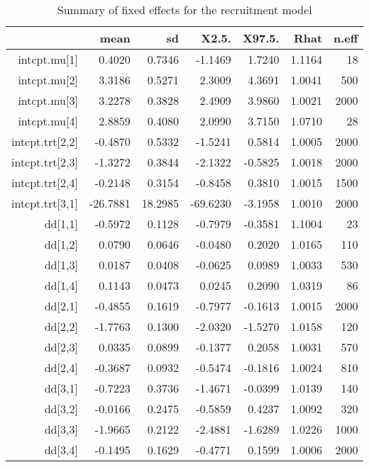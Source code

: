 \documentclass[11pt]{article}
\begin{document}
\begin{table}[ht]
\centering
\caption{Summary of fixed effects for the recruitment model} 
\label{table:recruitment}
\begin{tabular}{rrrrrrr}
  \hline
 & mean & sd & X2.5. & X97.5. & Rhat & n.eff \\ 
  \hline
intcpt.mu[1] & 0.4020 & 0.7346 & -1.1469 & 1.7240 & 1.1164 &    18 \\ 
  intcpt.mu[2] & 3.3186 & 0.5271 & 2.3009 & 4.3691 & 1.0041 &   500 \\ 
  intcpt.mu[3] & 3.2278 & 0.3828 & 2.4909 & 3.9860 & 1.0021 &  2000 \\ 
  intcpt.mu[4] & 2.8859 & 0.4080 & 2.0990 & 3.7150 & 1.0710 &    28 \\ 
  intcpt.trt[2,2] & -0.4870 & 0.5332 & -1.5241 & 0.5814 & 1.0005 &  2000 \\ 
  intcpt.trt[2,3] & -1.3272 & 0.3844 & -2.1322 & -0.5825 & 1.0018 &  2000 \\ 
  intcpt.trt[2,4] & -0.2148 & 0.3154 & -0.8458 & 0.3810 & 1.0015 &  1500 \\ 
  intcpt.trt[3,1] & -26.7881 & 18.2985 & -69.6230 & -3.1958 & 1.0010 &  2000 \\ 
  dd[1,1] & -0.5972 & 0.1128 & -0.7979 & -0.3581 & 1.1004 &    23 \\ 
  dd[1,2] & 0.0790 & 0.0646 & -0.0480 & 0.2020 & 1.0165 &   110 \\ 
  dd[1,3] & 0.0187 & 0.0408 & -0.0625 & 0.0989 & 1.0033 &   530 \\ 
  dd[1,4] & 0.1143 & 0.0473 & 0.0245 & 0.2090 & 1.0319 &    86 \\ 
  dd[2,1] & -0.4855 & 0.1619 & -0.7977 & -0.1613 & 1.0015 &  2000 \\ 
  dd[2,2] & -1.7763 & 0.1300 & -2.0320 & -1.5270 & 1.0158 &   120 \\ 
  dd[2,3] & 0.0335 & 0.0899 & -0.1377 & 0.2058 & 1.0031 &   570 \\ 
  dd[2,4] & -0.3687 & 0.0932 & -0.5474 & -0.1816 & 1.0024 &   810 \\ 
  dd[3,1] & -0.7223 & 0.3736 & -1.4671 & -0.0399 & 1.0139 &   140 \\ 
  dd[3,2] & -0.0166 & 0.2475 & -0.5859 & 0.4237 & 1.0092 &   320 \\ 
  dd[3,3] & -1.9665 & 0.2122 & -2.4881 & -1.6289 & 1.0226 &  1000 \\ 
  dd[3,4] & -0.1495 & 0.1629 & -0.4771 & 0.1599 & 1.0006 &  2000 \\ 

\end{tabular}
\end{table}
\end{document}
